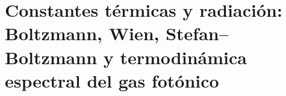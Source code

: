 \chapter{Constantes térmicas y radiación: Boltzmann, Wien, Stefan--Boltzmann y termodinámica espectral del gas fotónico}
\label{chap:p3-final:48:constantes_termicas}

